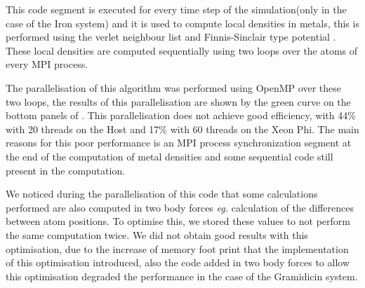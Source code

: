 \par{This code segment is executed for every time step of the simulation(only in the case of the Iron system) and it is used to 
compute local densities in metals, this is performed using the verlet neighbour list and Finnis-Sinclair type potential 
\citep{finnis1984sen}. These local densities are computed sequentially using two loops over the atoms of every MPI process.}

\par{The parallelisation of this algorithm was performed using OpenMP over these two loops, the results of this parallelisation
are shown by the green curve on the bottom panels of . This parallelisation does not achieve good efficiency, with 
44\% with 20 threads on the Host and 17\% with 60 threads on the Xeon Phi. The main reasons for this poor performance is an 
MPI process synchronization segment at the end of the computation of metal densities and some sequential code still present in
the computation.}

\par{We noticed during the parallelisation of this code that some calculations performed are also computed in 
two body forces \emph{eg.} calculation of the differences between atom positions. To optimise this, we stored these values to not 
perform the same computation twice. We did not obtain good results with this optimisation, due to the increase of memory foot 
print that the implementation of this optimisation introduced, also the code added in two body forces to allow this optimisation 
degraded the performance in the case of the Gramidicin system.}

